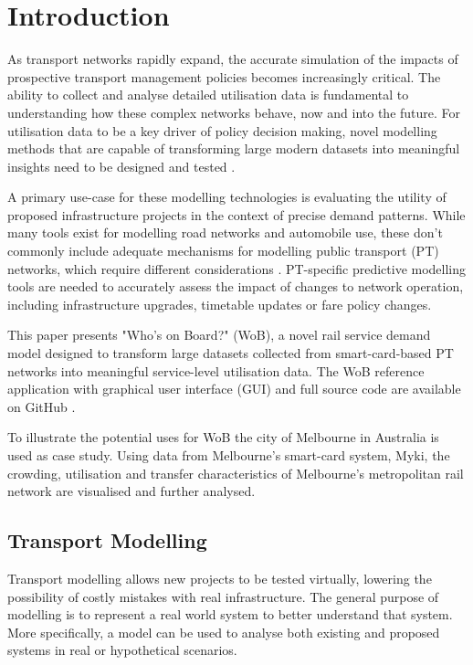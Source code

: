 \chapter{Introduction}
As transport networks rapidly expand, the accurate simulation of the impacts of prospective transport management policies becomes increasingly critical. The ability to collect and analyse detailed utilisation data is fundamental to understanding how these complex networks behave, now and into the future. For utilisation data to be a key driver of policy decision making, novel modelling methods that are capable of transforming large modern datasets into meaningful insights need to be designed and tested \cite{ghofraniRecentApplicationsBig2018, welchBigDataPublic2019}. 

A primary use-case for these modelling technologies is evaluating the utility of proposed infrastructure projects in the context of precise demand patterns. While many tools exist for modelling road networks and automobile use, these don't commonly include adequate mechanisms for modelling public transport (PT) networks, which require different considerations \cite{cortesMicrosimulationFlexibleTransit2005}. PT-specific predictive modelling tools are needed to accurately assess the impact of changes to network operation, including infrastructure upgrades, timetable updates or fare policy changes.

This paper presents  "Who's on Board?" (WoB), a novel rail service demand model designed to transform large datasets collected from smart-card-based PT networks into meaningful service-level utilisation data. The WoB reference application with graphical user interface (GUI) and full source code are available on GitHub \cite{bensutherlandWhosBoardRail2024}.

To illustrate the potential uses for WoB the city of Melbourne in Australia is used as case study. Using data from Melbourne's smart-card system, Myki, the crowding, utilisation and transfer characteristics of Melbourne's metropolitan rail network are visualised and further analysed. 

\section{Transport Modelling}
Transport modelling allows new projects to be tested virtually, lowering the possibility of costly mistakes with real infrastructure. The general purpose of modelling is to represent a real world system to better understand that system. More specifically, a model can be used to analyse both existing and proposed systems in real or hypothetical scenarios. 

